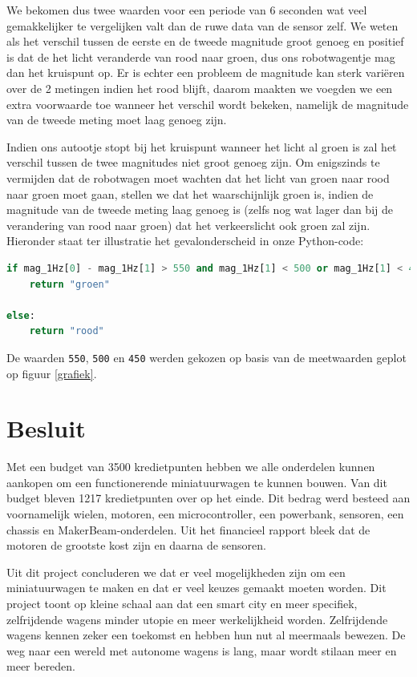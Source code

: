 \documentclass[a4paper,kulak]{kulakarticle}
\begin{document}
We bekomen dus twee waarden voor een periode van 6 seconden wat veel gemakkelijker te vergelijken valt dan de ruwe data van de sensor zelf. We weten als het verschil tussen de eerste en de tweede magnitude groot genoeg en positief is dat de het licht veranderde van rood naar groen, dus ons robotwagentje mag dan het kruispunt op. Er is echter een probleem de magnitude kan sterk variëren over de 2 metingen indien het rood blijft, daarom maakten we voegden we een extra voorwaarde toe wanneer het verschil wordt bekeken, namelijk de magnitude van de tweede meting moet laag genoeg zijn.

Indien ons autootje stopt bij het kruispunt wanneer het licht al groen is zal het verschil tussen de twee magnitudes niet groot genoeg zijn. Om enigszinds te vermijden dat de robotwagen moet wachten dat het licht van groen naar rood naar groen moet gaan, stellen we dat het waarschijnlijk groen is, indien de magnitude van de tweede meting laag genoeg is (zelfs nog wat lager dan bij de verandering van rood naar groen) dat het verkeerslicht ook groen zal zijn. Hieronder staat ter illustratie het gevalonderscheid in onze Python-code:

\begin{lstlisting}[language=Python]
if mag_1Hz[0] - mag_1Hz[1] > 550 and mag_1Hz[1] < 500 or mag_1Hz[1] < 450:
	return "groen"

else:
	return "rood"
\end{lstlisting}
 
De waarden \texttt{550}, \texttt{500} en \texttt{450} werden gekozen op basis van de meetwaarden geplot op figuur \ref{grafiek}.
\section{Besluit}


Met een budget van 3500 kredietpunten hebben we alle onderdelen kunnen aankopen om een functionerende miniatuurwagen te kunnen bouwen. Van dit budget bleven 1217 kredietpunten over op het einde. Dit bedrag werd besteed aan voornamelijk wielen, motoren, een microcontroller, een powerbank, sensoren, een chassis en MakerBeam-onderdelen. Uit het financieel rapport bleek dat de motoren de grootste kost zijn en daarna de sensoren. 

Uit dit project concluderen we dat er veel mogelijkheden zijn om een miniatuurwagen te maken en dat er veel keuzes gemaakt moeten worden. Dit project toont op kleine schaal aan dat een smart city en meer specifiek, zelfrijdende wagens minder utopie en meer werkelijkheid worden. Zelfrijdende wagens kennen zeker een toekomst en hebben hun nut al meermaals bewezen. De weg naar een wereld met autonome wagens is lang, maar wordt stilaan meer en meer bereden.
\end{document}
